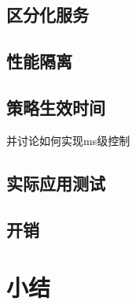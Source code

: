 \subsection{区分化服务}

\subsection{性能隔离}

\subsection{策略生效时间}

并讨论如何实现ms级控制

\subsection{实际应用测试}

\subsection{开销}


\section{小结}


